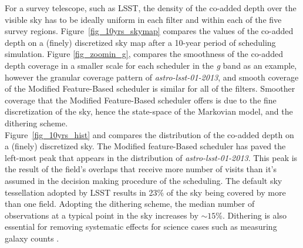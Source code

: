 \documentclass[11pt]{article}
\theoremstyle{definition}
\begin{document}
For a survey telescope, such as LSST, the density of the co-added depth over the visible sky has to be ideally uniform in each filter and within each of the five survey regions. Figure~\ref{fig_10yrs_skymap} compares the values of the co-added depth on a (finely) discretized sky map after a 10-year period of scheduling simulation. Figure \ref{fig_zoomin_g}, compares the smoothness of the co-added depth coverage in a smaller scale for each scheduler in the \textit{g} band as an example, however the granular coverage pattern of \textit{astro-lsst-01-2013}, and smooth coverage of the Modified Feature-Based scheduler is similar for all of the filters. Smoother coverage that the Modified Feature-Based scheduler offers is due to the fine discretization of the sky, hence the state-space of the Markovian model, and the dithering scheme. \\
Figure~\ref{fig_10yrs_hist} and compares the distribution of the co-added depth on a (finely) discretized sky. The Modified feature-Based scheduler has paved the left-most peak that appears in the distribution of \textit{astro-lsst-01-2013}. This peak is the result of the field's overlaps that receive more number of visits than it's assumed in the decision making procedure of the scheduling. The default sky tessellation adopted by LSST results in 23\% of the sky being covered by more than one field. Adopting the dithering scheme, the median number of observations at a typical point in the sky increases by $\sim15$\%. Dithering is also essential for removing systematic effects for science cases such as measuring galaxy counts \cite{Awan2016}.
\end{document}
